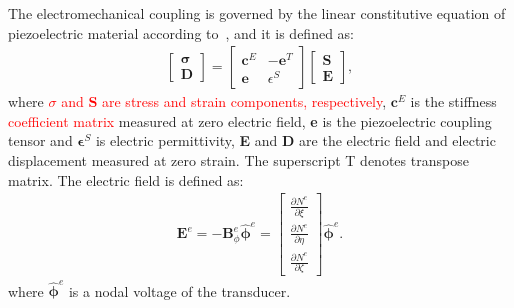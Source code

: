 \documentclass[sensors,article,submit,moreauthors,pdftex]{Definitions/mdpi}
\begin{document}
The electromechanical coupling is governed by the linear constitutive equation of piezoelectric material according to~\cite{giurgiutiumicromechatronics, rekatsinas2017cubic}, and it is defined as:
\begin{eqnarray}
\left [ 
\begin {array}{c}
\boldsymbol{\sigma}\\
\textbf{D}
\end{array}\right ]=
\left [ 
\begin{array}{cc}
\textbf{c}^E & -\textbf{e}^T \\
\textbf{e} & \epsilon^S 
\end{array} \right ]
\left[ 
\begin{array}{c}
\textbf{S}\\
\textbf{E} 
\end{array} \right ],
\end{eqnarray}
where \textcolor{red}{\(\sigma\) and \(\textbf{S}\) are stress and strain components, respectively}, \(\textbf{c}^E\) is the stiffness \textcolor{red}{coefficient matrix} measured at zero electric field, \textbf{e} is the piezoelectric coupling tensor and \(\boldsymbol{\epsilon}^S\) is electric permittivity, \textbf{E} and \textbf{D} are the electric field and electric displacement measured at zero strain.
The superscript T denotes transpose matrix.
The electric field is defined as:
\begin{eqnarray}
\textbf{E}^e=-\textbf{B}_\phi^e \widehat{\boldsymbol{\phi}}^e = \left[ \begin{array}{c}
\frac{\partial N^e}{\partial \xi}\\
\frac{\partial N^e}{\partial \eta}\\
\frac{\partial N^e}{\partial \zeta}
\end{array} \right] \widehat{\boldsymbol{\phi}}^e.
\end{eqnarray}
where \(\widehat{\boldsymbol{\phi}}^e\) is a nodal voltage of the transducer.
\end{document}
